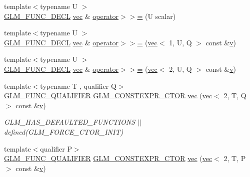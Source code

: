 \begin{DoxyCompactItemize}
\item 
{\footnotesize template$<$typename U $>$ }\\\hyperlink{setup_8hpp_ab2d052de21a70539923e9bcbf6e83a51}{G\+L\+M\+\_\+\+F\+U\+N\+C\+\_\+\+D\+E\+CL} \hyperlink{structglm_1_1vec}{vec} \& \hyperlink{structglm_1_1vec_3_012_00_01_t_00_01_q_01_4_a5cda1333155cc198e688a415467f93be}{operator$>$$>$=} (U scalar)
\item 
{\footnotesize template$<$typename U $>$ }\\\hyperlink{setup_8hpp_ab2d052de21a70539923e9bcbf6e83a51}{G\+L\+M\+\_\+\+F\+U\+N\+C\+\_\+\+D\+E\+CL} \hyperlink{structglm_1_1vec}{vec} \& \hyperlink{structglm_1_1vec_3_012_00_01_t_00_01_q_01_4_a6f9dfd8f7093aad6a2d57e830a990016}{operator$>$$>$=} (\hyperlink{structglm_1_1vec}{vec}$<$ 1, U, Q $>$ const \&\hyperlink{_s_d_l__opengl_8h_a10a82eabcb59d2fcd74acee063775f90}{v})
\item 
{\footnotesize template$<$typename U $>$ }\\\hyperlink{setup_8hpp_ab2d052de21a70539923e9bcbf6e83a51}{G\+L\+M\+\_\+\+F\+U\+N\+C\+\_\+\+D\+E\+CL} \hyperlink{structglm_1_1vec}{vec} \& \hyperlink{structglm_1_1vec_3_012_00_01_t_00_01_q_01_4_a39d690e7942ded7dbff157a33236b797}{operator$>$$>$=} (\hyperlink{structglm_1_1vec}{vec}$<$ 2, U, Q $>$ const \&\hyperlink{_s_d_l__opengl_8h_a10a82eabcb59d2fcd74acee063775f90}{v})
\item 
{\footnotesize template$<$typename T , qualifier Q$>$ }\\\hyperlink{setup_8hpp_a33fdea6f91c5f834105f7415e2a64407}{G\+L\+M\+\_\+\+F\+U\+N\+C\+\_\+\+Q\+U\+A\+L\+I\+F\+I\+ER} \hyperlink{setup_8hpp_ad34178a09666081abdb573c14d1f4a5a}{G\+L\+M\+\_\+\+C\+O\+N\+S\+T\+E\+X\+P\+R\+\_\+\+C\+T\+OR} \hyperlink{structglm_1_1vec_3_012_00_01_t_00_01_q_01_4_a1dc70d40254a106cf1589d2fb91cadf8}{vec} (\hyperlink{structglm_1_1vec}{vec}$<$ 2, T, Q $>$ const \&\hyperlink{_s_d_l__opengl_8h_a10a82eabcb59d2fcd74acee063775f90}{v})
\begin{DoxyCompactList}\small\item\em G\+L\+M\+\_\+\+H\+A\+S\+\_\+\+D\+E\+F\+A\+U\+L\+T\+E\+D\+\_\+\+F\+U\+N\+C\+T\+I\+O\+NS $\vert$$\vert$ defined(\+G\+L\+M\+\_\+\+F\+O\+R\+C\+E\+\_\+\+C\+T\+O\+R\+\_\+\+I\+N\+I\+T) \end{DoxyCompactList}\item 
{\footnotesize template$<$qualifier P$>$ }\\\hyperlink{setup_8hpp_a33fdea6f91c5f834105f7415e2a64407}{G\+L\+M\+\_\+\+F\+U\+N\+C\+\_\+\+Q\+U\+A\+L\+I\+F\+I\+ER} \hyperlink{setup_8hpp_ad34178a09666081abdb573c14d1f4a5a}{G\+L\+M\+\_\+\+C\+O\+N\+S\+T\+E\+X\+P\+R\+\_\+\+C\+T\+OR} \hyperlink{structglm_1_1vec_3_012_00_01_t_00_01_q_01_4_a207754db3db8bcf1251e3b46a1e2c58c}{vec} (\hyperlink{structglm_1_1vec}{vec}$<$ 2, T, P $>$ const \&\hyperlink{_s_d_l__opengl_8h_a10a82eabcb59d2fcd74acee063775f90}{v})

\end{DoxyCompactItemize}
